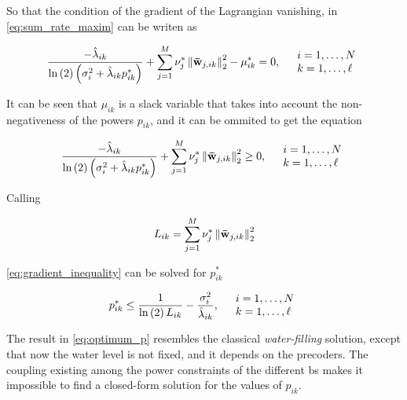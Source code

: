 So that the condition of the gradient of the Lagrangian vanishing, in
\eqref{eq:sum_rate_maxim} can be writen as

\begin{equation} \label{eq:gradient_vanishing}
    \frac{-\hat{\lambda}_{ik}}{\ln\left(2\right)\left(\sigma_i^2 +
    \hat{\lambda}_{ik} p_{ik}^\ast\right)} +
    \sum\limits_{j = 1}^M \nu_j^\ast \left\|\mathbf{\bar{w}}_{j, ik}\right\|_2^2 -
    \mu_{ik}^\ast = 0,\quad
	\begin{array}{l}
	i = 1, \ldots, N\\
	k = 1, \ldots, \ell
	\end{array}\\
\end{equation}

It can be seen that $\mu_{ik}$ is a slack variable that takes into account the
non-negativeness of the powers $p_{ik}$, and it can be ommited to get the
equation

\begin{equation} \label{eq:gradient_inequality}
    \frac{-\hat{\lambda}_{ik}}{\ln\left(2\right)\left(\sigma_i^2 +
    \hat{\lambda}_{ik} p_{ik}^\ast\right)} +
    \sum\limits_{j = 1}^M \nu_j^\ast \left\|\mathbf{\bar{w}}_{j, ik}\right\|_2^2
    \geq 0,\quad
	\begin{array}{l}
	i = 1, \ldots, N\\
	k = 1, \ldots, \ell
	\end{array}\\
\end{equation}

Calling

\begin{equation} \label{eq:term_columns_w}
    L_{ik} = \sum\limits_{j = 1}^M \nu_j^\ast \left\|\mathbf{\bar{w}}_{j, ik}\right\|_2^2
\end{equation}

\noindent
\eqref{eq:gradient_inequality} can be solved for $p_{ik}^\ast$

\begin{equation} \label{eq:optimum_p}
    p_{ik}^\ast \leq \frac{1}{\ln\left(2\right)L_{ik}} - \frac{\sigma_i^2}
    {\hat{\lambda}_{ik}}, \quad
	\begin{array}{l}
	i = 1, \ldots, N\\
	k = 1, \ldots, \ell
	\end{array}\\
\end{equation}

The result in \eqref{eq:optimum_p} resembles the classical \emph{water-filling}
solution, except that now the water level is not fixed, and it depends on the
precoders. The coupling existing among the power constraints of the different
\gls{bs} makes it impossible to find a closed-form solution for the values of
$p_{ik}$.

